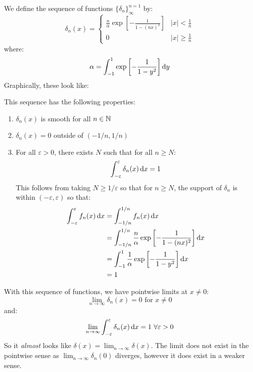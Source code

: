 \documentclass[../main.tex]{subfiles}
\begin{document}
We define the sequence of functions $\{\delta_n\}^{n = 1}_{\infty}$ by:
\[
  \delta_n(x) = \begin{cases}
  \frac{n}{\alpha}\exp\left[-\frac{1}{1 - (nx)^2}\right] & |x| < \frac{1}{n} \\
  0 & |x| \geq \frac{1}{n}
  \end{cases}
\]
where:
\[
  \alpha = \int_{-1}^{1} \exp\left[-\frac{1}{1 - y^2}\right] \d{y}
\]
Graphically, these look like:
\begin{center}
\end{center}
This sequence has the following properties:
\begin{enumerate}
  \item $\delta_n(x)$ is smooth for all $n \in \mathbb{N}$
  \item $\delta_n(x) = 0$ outside of $(-1/n, 1/n)$
  \item For all $\varepsilon > 0$, there exists $N$ such that for all $n \geq N$:
    \[
      \int_{-\varepsilon}^{\varepsilon} \delta_n(x) \d{x} = 1
    \]
    This follows from taking $N \geq 1/\varepsilon$ so that for $n \geq N$, the support of $\delta_n$ is within $(-\varepsilon, \varepsilon)$ so that:
    \begin{align*}
      \int_{-\varepsilon}^{\varepsilon} f_n(x) \d{x} &= \int_{-1/n}^{1/n} f_n(x) \d{x} \\
                                                     &= \int_{-1/n}^{1/n} \frac{n}{\alpha} \exp\left[-\frac{1}{1 - (n x)^2}\right] \d{x} \\
                                                     &= \int_{-1}^{1} \frac{1}{\alpha} \exp\left[-\frac{1}{1 - y^2}\right] \d{x} \\
                                                     &= 1
    \end{align*}
\end{enumerate}
With this sequence of functions, we have pointwise limits at $x \neq 0$:
\[
  \lim_{n \to \infty} \delta_n(x) = 0 \text{ for $x \neq 0$}
\]
and:
\[
  \lim_{n \to \infty} \int_{-\varepsilon}^{\varepsilon} \delta_n(x) \d{x} = 1\ \forall \varepsilon > 0
\]
So it \textit{almost} looks like $\delta(x) = \lim_{n \to \infty} \delta(x)$.
The limit does not exist in the pointwise sense as $\lim_{n \to \infty} \delta_n(0)$ diverges, however it does exist in a weaker sense.
\end{document}
